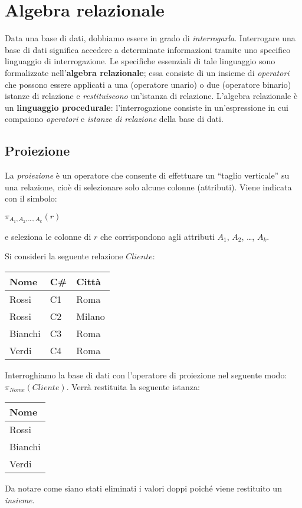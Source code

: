 \section{Algebra relazionale}
Data una base di dati, dobbiamo essere in grado di \emph{interrogarla}. Interrogare una
base di dati significa accedere a determinate informazioni tramite uno specifico linguaggio
di interrogazione. Le specifiche essenziali di tale linguaggio sono formalizzate 
nell'\textbf{algebra relazionale}; essa consiste di un insieme di \emph{operatori} che 
possono essere applicati a una (operatore unario) o due (operatore binario) istanze di 
relazione e \emph{restituiscono} un'istanza di relazione. L'algebra relazionale è un 
\textbf{linguaggio procedurale}: l'interrogazione consiste in un'espressione in
cui compaiono \emph{operatori} e \emph{istanze di relazione} della base di dati.

\subsection{Proiezione}
La \emph{proiezione} è un operatore che consente di effettuare un ``taglio verticale''
su una relazione, cioè di selezionare solo alcune colonne (attributi). Viene indicata
con il simbolo:
\begin{center}
\begin{math}
 \pi_{A_1, A_2, \ldots, A_k}(r)
\end{math}
\end{center}
e seleziona le colonne di $r$ che corrispondono agli attributi $A_1$, $A_2$, \ldots, $A_k$.

\begin{exmp}
Si consideri la seguente relazione $Cliente$:
\begin{center}
\begin{tabular}{l |l | l}
  Nome & C\# & Città\\
  \hline
  Rossi & C1 & Roma\\
  Rossi & C2 & Milano\\
  Bianchi & C3 & Roma\\
  Verdi & C4 & Roma\\
\end{tabular}
\end{center}
Interroghiamo la base di dati con l'operatore di proiezione nel seguente modo: $\pi_{Nome}(Cliente)$.
Verrà restituita la seguente istanza:
\begin{center}
\begin{tabular}{l}
  Nome \\
  \hline
  Rossi \\
  Bianchi\\
  Verdi\\
\end{tabular}
\end{center}
Da notare come siano stati eliminati i valori doppi poiché viene restituito un \emph{insieme}.
\end{exmp}

